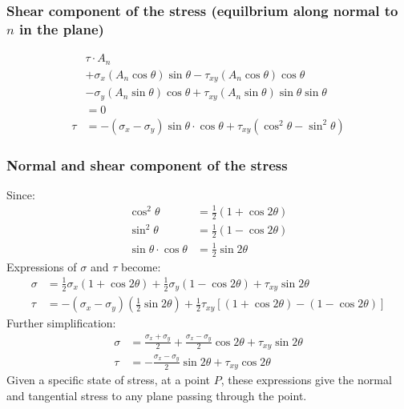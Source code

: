 \subsubsection{Shear component of the stress (equilbrium along normal to $n$ in the plane)}
\begin{align}
       & \tau \cdot A_n                                                                                                    \\
       & +\sigma_x \left(A_n\cos\theta\right)\sin\theta - \tau_{xy}\left(A_n\cos\theta\right)\cos\theta                    \\
       & -\sigma_y \left(A_n\sin\theta\right)\cos\theta + \tau_{xy}\left(A_n\sin\theta\right)\sin\theta\sin\theta          \\
       & =0                                                                                                                \\
  \tau & = - \left(\sigma_x - \sigma_y\right)\sin\theta \cdot \cos\theta + \tau_{xy}\left(\cos^2\theta-\sin^2\theta\right)
\end{align}
\subsubsection{Normal and shear component of the stress}
Since:
\begin{align}
  \cos^2 \theta               & = \frac{1}{2} \left(1 + \cos 2\theta\right) \\
  \sin^2 \theta               & = \frac{1}{2} \left(1 - \cos 2\theta\right) \\
  \sin\theta \cdot \cos\theta & = \frac{1}{2}\sin 2\theta
\end{align}
Expressions of $\sigma$ and $\tau$ become:
\begin{align}
  \sigma & = \frac{1}{2} \sigma_x \left(1+\cos 2\theta \right) + \frac{1}{2}\sigma_y\left(1-\cos 2\theta\right) + \tau_{xy} \sin 2\theta                                         \\
  \tau   & = - \left(\sigma_x - \sigma_y\right) \left(\frac{1}{2}\sin 2\theta\right) + \frac{1}{2}\tau_{xy} \left[\left(1+\cos 2\theta\right)-\left(1-\cos 2\theta\right)\right]
\end{align}
Further simplification:
\begin{align}
  \sigma & = \frac{\sigma_x + \sigma_y}{2} + \frac{\sigma_x - \sigma_y}{2}\cos 2\theta + \tau_{xy}\sin 2\theta \\
  \tau   & = - \frac{\sigma_x - \sigma_y}{2}\sin 2\theta + \tau_{xy}\cos 2\theta
\end{align}
Given a specific state of stress, at a point $P$, these expressions give the normal and tangential stress to any plane passing through the point.
